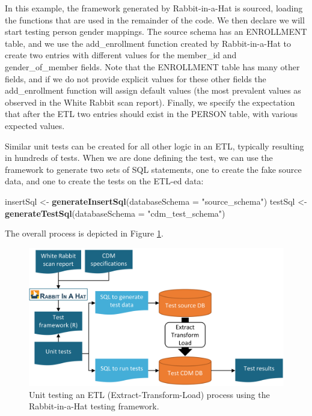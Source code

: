 \documentclass[11pt]{book}
\newenvironment{Shaded}{\begin{snugshade}}{\end{snugshade}}
\newcommand{\DataTypeTok}[1]{\textcolor[rgb]{0.13,0.29,0.53}{#1}}
\newcommand{\KeywordTok}[1]{\textcolor[rgb]{0.13,0.29,0.53}{\textbf{#1}}}
\newcommand{\NormalTok}[1]{#1}
\newcommand{\StringTok}[1]{\textcolor[rgb]{0.31,0.60,0.02}{#1}}
\theoremstyle{definition}
\theoremstyle{definition}
\theoremstyle{definition}
\theoremstyle{remark}
\begin{document}
In this example, the framework generated by Rabbit-in-a-Hat is sourced, loading the functions that are used in the remainder of the code. We then declare we will start testing person gender mappings. The source schema has an ENROLLMENT table, and we use the add\_enrollment function created by Rabbit-in-a-Hat to create two entries with different values for the member\_id and gender\_of\_member fields. Note that the ENROLLMENT table has many other fields, and if we do not provide explicit values for these other fields the add\_enrollment function will assign default values (the most prevalent values as observed in the White Rabbit scan report). Finally, we specify the expectation that after the ETL two entries should exist in the PERSON table, with various expected values.

Similar unit tests can be created for all other logic in an ETL, typically resulting in hundreds of tests. When we are done defining the test, we can use the framework to generate two sets of SQL statements, one to create the fake source data, and one to create the tests on the ETL-ed data:

\begin{Shaded}
\begin{Highlighting}[]
\NormalTok{insertSql <-}\StringTok{ }\KeywordTok{generateInsertSql}\NormalTok{(}\DataTypeTok{databaseSchema =} \StringTok{"source_schema"}\NormalTok{)}
\NormalTok{testSql <-}\StringTok{ }\KeywordTok{generateTestSql}\NormalTok{(}\DataTypeTok{databaseSchema =} \StringTok{"cdm_test_schema"}\NormalTok{)}
\end{Highlighting}
\end{Shaded}

The overall process is depicted in Figure \ref{fig:testFramework}.

\begin{figure}

{\centering \includegraphics[width=0.9\linewidth]{images/DataQuality/testFramework} 

}

\caption{Unit testing an ETL (Extract-Transform-Load) process using the Rabbit-in-a-Hat testing framework.}\label{fig:testFramework}
\end{figure}
\end{document}
